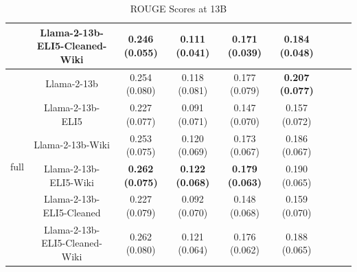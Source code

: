 \documentclass[11pt, oneside]{article}   	%
\begin{document}
\begin{table}[ht]
\begin{tabular}{lcccccccc}
& Llama-2-13b-ELI5-Cleaned-Wiki & 0.246 (0.055) & 0.111 (0.041) & \textbf{0.171 (0.039)} & 0.184 (0.048) \\
\midrule
\multirow{6}{*}{full} & Llama-2-13b & 0.254 (0.080) & 0.118 (0.081) & 0.177 (0.079) & \textbf{0.207 (0.077)} \\
& Llama-2-13b-ELI5 & 0.227 (0.077) & 0.091 (0.071) & 0.147 (0.070) & 0.157 (0.072) \\
& Llama-2-13b-Wiki & 0.253 (0.075) & 0.120 (0.069) & 0.173 (0.067) & 0.186 (0.067) \\
& Llama-2-13b-ELI5-Wiki & \textbf{0.262 (0.075)} & \textbf{0.122 (0.068)} & \textbf{0.179 (0.063)} & 0.190 (0.065) \\
& Llama-2-13b-ELI5-Cleaned & 0.227 (0.079) & 0.092 (0.070) & 0.148 (0.068) & 0.159 (0.070) \\
& Llama-2-13b-ELI5-Cleaned-Wiki & 0.262 (0.080) & 0.121 (0.064) & 0.176 (0.062) & 0.188 (0.065) \\
\bottomrule
\end{tabular}
\caption{ROUGE Scores at 13B}
\label{tab:rouge_scores_13B}
\end{table}
\end{document}
